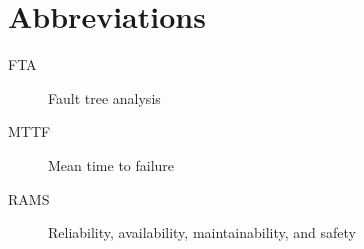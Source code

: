 
\chapter*{Abbreviations}
\begin{description}
\item[FTA] Fault tree analysis
\item[MTTF] Mean time to failure
\item[RAMS] Reliability, availability, maintainability, and safety
\end{description}